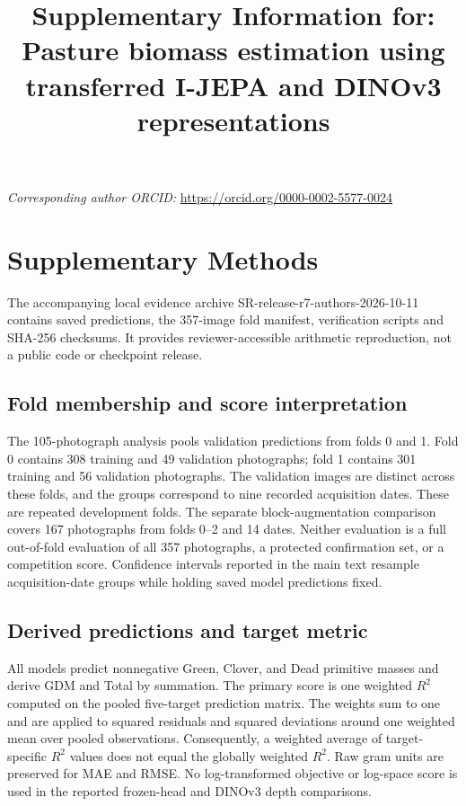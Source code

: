 \documentclass[pdflatex,a4paper,sn-nature]{sn-jnl}
\begin{document}
\title[Supplementary information]{Supplementary Information for: Pasture biomass estimation using transferred I-JEPA and DINOv3 representations}
\author*[1]{ }
\author[1]{ }
\author[1]{ }
\author[1]{ }
\maketitle
\noindent\textit{Corresponding author ORCID:} \url{https://orcid.org/0000-0002-5577-0024}\par

\section*{Supplementary Methods}
The accompanying local evidence archive SR-release-r7-authors-2026-10-11 contains saved predictions, the 357-image fold manifest, verification scripts and SHA-256 checksums. It provides reviewer-accessible arithmetic reproduction, not a public code or checkpoint release.

\subsection*{Fold membership and score interpretation}
The 105-photograph analysis pools validation predictions from folds 0 and 1. Fold 0 contains 308 training and 49 validation photographs; fold 1 contains 301 training and 56 validation photographs. The validation images are distinct across these folds, and the groups correspond to nine recorded acquisition dates. These are repeated development folds. The separate block-augmentation comparison covers 167 photographs from folds 0--2 and 14 dates. Neither evaluation is a full out-of-fold evaluation of all 357 photographs, a protected confirmation set, or a competition score. Confidence intervals reported in the main text resample acquisition-date groups while holding saved model predictions fixed.

\subsection*{Derived predictions and target metric}
All models predict nonnegative Green, Clover, and Dead primitive masses and derive GDM and Total by summation. The primary score is one weighted $R^2$ computed on the pooled five-target prediction matrix. The weights sum to one and are applied to squared residuals and squared deviations around one weighted mean over pooled observations. Consequently, a weighted average of target-specific $R^2$ values does not equal the globally weighted $R^2$. Raw gram units are preserved for MAE and RMSE. No log-transformed objective or log-space score is used in the reported frozen-head and DINOv3 depth comparisons.
\end{document}
